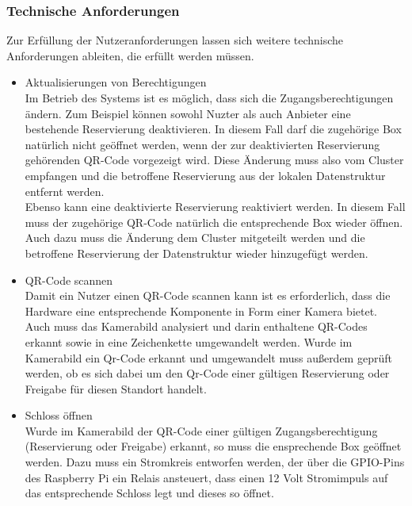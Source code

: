 \documentclass[openright,twoside,a4paper]{scrartcl}
\begin{document}
            \subsubsection{Technische Anforderungen}
                Zur Erfüllung der Nutzeranforderungen lassen sich weitere technische Anforderungen ableiten, die erfüllt werden müssen.
                \begin{itemize}
                    \item Aktualisierungen von Berechtigungen \\ 
                    Im Betrieb des Systems ist es möglich, dass sich die Zugangsberechtigungen ändern. Zum Beispiel können sowohl Nuzter als auch Anbieter eine bestehende Reservierung deaktivieren. In diesem Fall darf die zugehörige Box natürlich nicht geöffnet werden, wenn der zur deaktivierten Reservierung gehörenden QR-Code vorgezeigt wird. Diese Änderung muss also vom Cluster empfangen und die betroffene Reservierung aus der lokalen Datenstruktur entfernt werden. \\
                    Ebenso kann eine deaktivierte Reservierung reaktiviert werden. In diesem Fall muss der zugehörige QR-Code natürlich die entsprechende Box wieder öffnen. Auch dazu muss die Änderung dem Cluster mitgeteilt werden und die betroffene Reservierung der Datenstruktur wieder hinzugefügt werden.
                    
                    \item QR-Code scannen \\
                    Damit ein Nutzer einen QR-Code scannen kann ist es erforderlich, dass die Hardware eine entsprechende Komponente in Form einer Kamera bietet. Auch muss das Kamerabild analysiert und darin enthaltene QR-Codes erkannt sowie in eine Zeichenkette umgewandelt werden. Wurde im Kamerabild ein Qr-Code erkannt und umgewandelt muss außerdem geprüft werden, ob es sich dabei um den Qr-Code einer gültigen Reservierung oder Freigabe für diesen Standort handelt.
                    
                    \item Schloss öffnen \\
                    Wurde im Kamerabild der QR-Code einer gültigen Zugangsberechtigung (Reservierung oder Freigabe) erkannt, so muss die ensprechende Box geöffnet werden. Dazu muss ein Stromkreis entworfen werden, der über die GPIO-Pins des Raspberry Pi ein Relais ansteuert, dass einen 12 Volt Stromimpuls auf das entsprechende Schloss legt und dieses so öffnet.


\end{itemize}
\end{document}
